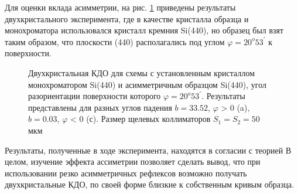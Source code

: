 Для оценки вклада асимметрии, на рис. \ref{ris:assymetric_exp_50}
  приведены результаты двухкристального эксперимента, где в качестве
  кристалла образца и монохроматора использовался кристалл кремния Si(440), но образец был взят таким
  образом, что плоскости (440) располагались под углом $\varphi = 20^o 53^{'}$ к поверхности.

  \begin{figure}[H]
    \centering
    \hfill
    \hfill

    \caption{Двухкристальная КДО для схемы с установленным кристаллом монохроматором Si(440) и асимметричным образцом Si(440),
    угол разориентации поверхности которого $\varphi = 20^o53^{'}$. Результаты представлены для разных углов падения
    $b = 33.52$, $\varphi$ > 0 (a), $b = 0.03$, $\varphi$ < 0  (с).
     Размер щелевых коллиматоров $S_1 = S_2 = 50$ мкм}
    \label{ris:assymetric_exp_50}
  \end{figure}

Результаты, полученные в ходе эксперимента, находятся в согласии с теорией
В целом, изучение эффекта ассиметрии позволяет сделать вывод, что при использовании резко
асимметричных рефлексов возможно получать двухкристальные КДО, по своей форме
 близкие к собственным кривым образца.


